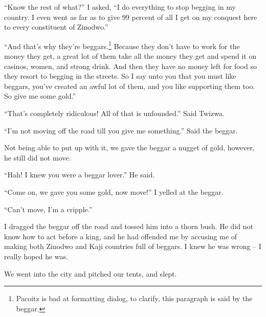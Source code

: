 ``Know the rest of what?'' I asked, ``I do everything to stop begging in my country. I even went as far as to give 99 percent of all I get on my conquest here to every constituent of Zi\-no\-dwo.''

``And that's why they're beggars.\footnote{Pa\-co\-itz is bad at formatting dialog, to clarify, this paragraph is said by the beggar.} Because they don't have to work for the money they get, a great lot of them take all the money they get and spend it on casinos, women, and strong drink. And then they have no money left for food so they resort to begging in the streets. So I say unto you that you must like beggars, you've created an awful lot of them, and you like supporting them too. So give me some gold.''

``That's completely ridiculous! All of that is unfounded.'' Said Twi\-zwa.

``I'm not moving off the road till you give me something.'' Said the beggar.

Not being able to put up with it, we gave the beggar a nugget of gold, however, he still did not move.

``Hah! I knew you were a beggar lover.'' He said.

``Come on, we gave you some gold, now move!'' I yelled at the beggar.

``Can't move, I'm a cripple.''

I dragged the beggar off the road and tossed him into a thorn bush. He did not know how to act before a king, and he had offended me by accusing me of making both Zi\-no\-dwo and Ka\-ji countries full of beggars. I knew he was wrong -- I really hoped he was.

We went into the city and pitched our tents, and slept.

